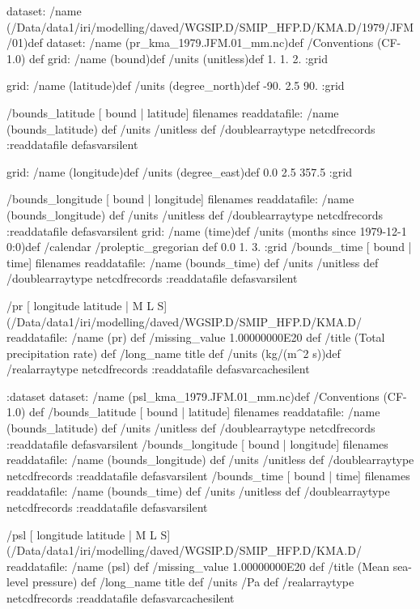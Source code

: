 dataset:
/name (/Data/data1/iri/modelling/daved/WGSIP.D/SMIP_HFP.D/KMA.D/1979/JFM/01)def
dataset:
/name (pr_kma_1979.JFM.01_mm.nc)def
 /Conventions (CF-1.0) def
grid:
/name (bound)def
/units (unitless)def
 1. 1. 2.
:grid
\begin{ingrid}
grid:
/name (latitude)def
/units (degree_north)def
 -90. 2.5 90.
:grid
\end{ingrid}
 /bounds_latitude{
[ bound | latitude] filenames readdatafile:
/name (bounds_latitude) def
 /units /unitless def
 /doublearraytype netcdfrecords :readdatafile
}defasvarsilent
\begin{ingrid}
grid:
/name (longitude)def
/units (degree_east)def
 0.0 2.5 357.5
:grid
\end{ingrid}
 /bounds_longitude{
[ bound | longitude] filenames readdatafile:
/name (bounds_longitude) def
 /units /unitless def
 /doublearraytype netcdfrecords :readdatafile
}defasvarsilent
grid:
/name (time)def
/units (months since 1979-12-1 0:0)def
/calendar /proleptic_gregorian def
 0.0 1. 3.
:grid
 /bounds_time{
[ bound | time] filenames readdatafile:
/name (bounds_time) def
 /units /unitless def
 /doublearraytype netcdfrecords :readdatafile
}defasvarsilent
\begin{ingrid}
 /pr{
[ longitude latitude | M L S]
(/Data/data1/iri/modelling/daved/WGSIP.D/SMIP_HFP.D/KMA.D/%
 readdatafile:
/name (pr) def
 /missing_value 1.00000000E20 def
 /title (Total precipitation rate) def
 /long_name title def /units  (kg/(m^2 s))def
 /realarraytype netcdfrecords :readdatafile
}defasvarcachesilent
\end{ingrid}
:dataset
dataset:
/name (psl_kma_1979.JFM.01_mm.nc)def
 /Conventions (CF-1.0) def
 /bounds_latitude{
[ bound | latitude] filenames readdatafile:
/name (bounds_latitude) def
 /units /unitless def
 /doublearraytype netcdfrecords :readdatafile
}defasvarsilent
 /bounds_longitude{
[ bound | longitude] filenames readdatafile:
/name (bounds_longitude) def
 /units /unitless def
 /doublearraytype netcdfrecords :readdatafile
}defasvarsilent
 /bounds_time{
[ bound | time] filenames readdatafile:
/name (bounds_time) def
 /units /unitless def
 /doublearraytype netcdfrecords :readdatafile
}defasvarsilent
\begin{ingrid}
 /psl{
[ longitude latitude | M L S]
(/Data/data1/iri/modelling/daved/WGSIP.D/SMIP_HFP.D/KMA.D/%
 readdatafile:
/name (psl) def
 /missing_value 1.00000000E20 def
 /title (Mean sea-level pressure) def
 /long_name title def /units /Pa def
 /realarraytype netcdfrecords :readdatafile
}defasvarcachesilent
\end{ingrid}
